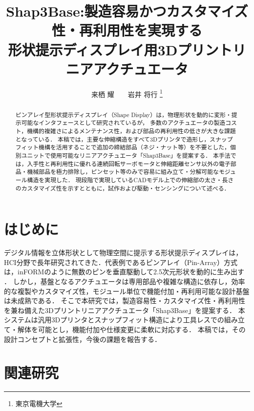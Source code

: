 \documentclass[twoside]{wiss}
\renewcommand{\affil}[1]{%
  \begingroup
    \let\footnotemark\relax
    \thanks{#1}%
  \endgroup
}
\begin{document}
\title{Shap3Base:製造容易かつカスタマイズ性・再利用性を実現する\\形状提示ディスプレイ用3Dプリントリニアアクチュエータ}
\etitle{}%
%
%
%
\author{来栖 耀　　岩井 将行\affil{東京電機大学}}

\begin{abstract}
ピンアレイ型形状提示ディスプレイ（Shape Display）は，物理形状を動的に変形・提示可能なインタフェースとして研究されているが，
多数のアクチュエータの製造コスト，機構的複雑さによるメンテナンス性，および部品の再利用性の低さが大きな課題となっている．
本稿では，主要な伸縮構造をすべて3Dプリンタで造形し，スナップフィット機構を活用することで追加の締結部品（ネジ・ナット等）を不要とした，個別ユニットで使用可能なリニアアクチュエータ「Shap3Base」を提案する．
本手法では，入手性と再利用性に優れる連続回転サーボモータと伸縮距離センサ以外の電子部品・機械部品を極力排除し，ピンセット等のみで容易に組み立て・分解可能なモジュール構造を実現した．
現段階で実現しているCADモデル上での伸縮部の太さ・長さのカスタマイズ性を示すとともに，試作および駆動・センシングについて述べる．
\end{abstract}

\maketitle

\section{はじめに}

デジタル情報を立体形状として物理空間に提示する形状提示ディスプレイは，HCI分野で長年研究されてきた．代表例であるピンアレイ（Pin-Array）方式は，inFORMのように無数のピンを垂直駆動して2.5次元形状を動的に生み出す\cite{inform2013} \cite{shapedisplays_spatial2015} ．
しかし，基盤となるアクチュエータは専用部品や複雑な構造に依存し，効率的な複製やカスタマイズ性，モジュール単位で機能付加・再利用可能な設計基盤は未成熟である．
そこで本研究では，製造容易性・カスタマイズ性・再利用性を兼ね備えた3Dプリントリニアアクチュエータ「Shap3Base」を提案する．
本システムは汎用3Dプリンタとスナップフィット構造により工具レスでの組み立て・解体を可能とし，機能付加や仕様変更に柔軟に対応する．
本稿では，その設計コンセプトと拡張性，今後の課題を報告する．

\section{関連研究}
\end{document}
